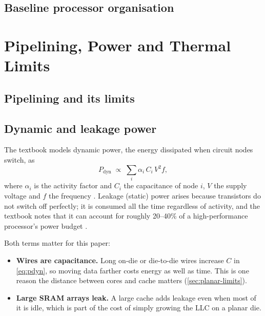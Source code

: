 \subsection{Baseline processor organisation}

\section{Pipelining, Power and Thermal Limits}
\label{sec:pipelining-power}

\subsection{Pipelining and its limits}

\subsection{Dynamic and leakage power}
\label{sec:power}

The textbook models dynamic power, the energy dissipated when circuit nodes switch, as
\begin{equation}
  P_{\mathrm{dyn}} \;\propto\; \sum_{i} \alpha_i\, C_i\, V^2 f,
  \label{eq:pdyn}
\end{equation}
where $\alpha_i$ is the activity factor and $C_i$ the capacitance of node $i$, $V$ the supply voltage and $f$ the frequency \cite[sec.~10.10.2]{sarangi2025basic}. Leakage (static) power arises because transistors do not switch off perfectly; it is consumed all the time regardless of activity, and the textbook notes that it can account for roughly 20--40\% of a high-performance processor's power budget \cite[sec.~10.10.3]{sarangi2025basic}.

Both terms matter for this paper:
\begin{itemize}
  \item \textbf{Wires are capacitance.} Long on-die or die-to-die wires increase $C$ in \cref{eq:pdyn}, so moving data farther costs energy as well as time. This is one reason the distance between cores and cache matters (\cref{sec:planar-limits}).
  \item \textbf{Large SRAM arrays leak.} A large cache adds leakage even when most of it is idle, which is part of the cost of simply growing the LLC on a planar die.
\end{itemize}

